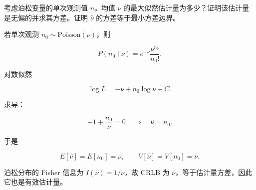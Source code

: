 \begin{question}
考虑泊松变量的单次观测值 \(n\)。均值 \(\nu\)
的最大似然估计量为多少？证明该估计量是无偏的并求其方差。证明 \(\hat\nu\)
的方差等于最小方差边界。
\begin{solution}
若单次观测 \(n_0\sim\mathrm{Poisson}(\nu)\)，则

\[
P(n_0\mid\nu)=e^{-\nu}\frac{\nu^{n_0}}{n_0!}.
\]

对数似然

\[
\log L=-\nu+n_0\log\nu+C.
\]

求导：

\[
-1+\frac{n_0}{\nu}=0
\quad\Rightarrow\quad
\hat\nu=n_0.
\]

于是

\[
E[\hat\nu]=E[n_0]=\nu,
\qquad
V[\hat\nu]=V[n_0]=\nu.
\]

泊松分布的 Fisher 信息为 \(I(\nu)=1/\nu\)，故 CRLB 为
\(\nu\)，等于估计量方差，因此它也是有效估计量。
\end{solution}
\end{question}



